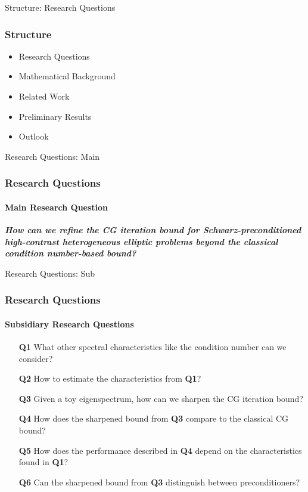 \begin{frame}{Structure: Research Questions}
    \frametitle{Structure}
    \begin{itemize}
        \item {\color{tud grapefruit}Research Questions}
        \item Mathematical Background
        \item Related Work
        \item Preliminary Results
        \item Outlook
    \end{itemize}
\end{frame}

\begin{frame}[label=questions]{Research Questions: Main}
    \frametitle{Research Questions}
    \framesubtitle{Main Research Question}
    \vspace{0.2\pageheight}
    \begin{center}
    \textit{\textbf{How can we refine the CG iteration bound for Schwarz-preconditioned high-contrast heterogeneous elliptic problems beyond the classical condition number-based bound?}}
    \end{center}
\end{frame}

\begin{frame}[label=questions]{Research Questions: Sub}
    \frametitle{Research Questions}
    \framesubtitle{Subsidiary Research Questions}
    \setlength\itemindent{1in}
    \begin{itemize}
        \item[\textbf{Q1}] What other spectral characteristics like the condition number can we consider?
        \item[\textbf{Q2}] How to estimate the characteristics from \textbf{Q1}?
        \item[\textbf{Q3}] Given a toy eigenspectrum, how can we sharpen the CG iteration bound?
        \item[\textbf{Q4}] How does the sharpened bound from \textbf{Q3} compare to the classical CG bound?
        \item[\textbf{Q5}] How does the performance described in \textbf{Q4} depend on the characteristics found in \textbf{Q1}?
        \item[\textbf{Q6}] Can the sharpened bound from \textbf{Q3} distinguish between preconditioners? 
    \end{itemize}
\end{frame}